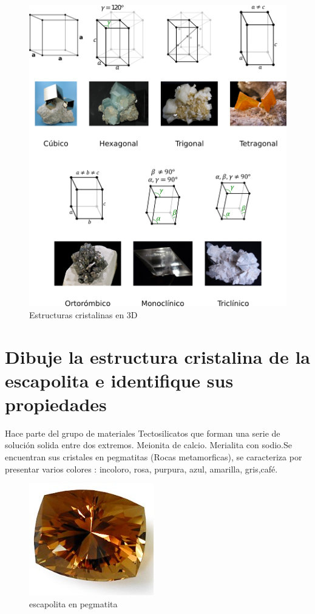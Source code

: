 \documentclass[12pt,a4paper]{article}
\begin{document}
\begin{figure}[H] 
    \centering
    \includegraphics[scale= 0.2]{i.png}
    \caption{Estructuras cristalinas en 3D}
\end{figure}


\section{Dibuje la estructura cristalina de la escapolita e identifique sus propiedades}

Hace parte del grupo de materiales Tectosilicatos que forman una serie de solución solida entre dos extremos. Meionita de calcio. Merialita con sodio.Se encuentran sus cristales en pegmatitas (Rocas metamorficas), se caracteriza por presentar varios colores : incoloro, rosa, purpura, azul, amarilla, gris,café.

 \begin{figure}[H]
    \centering
	\includegraphics[width=0.3\linewidth]{k.jpg}
	 \caption{escapolita en pegmatita}
\end{figure}
\end{document}
